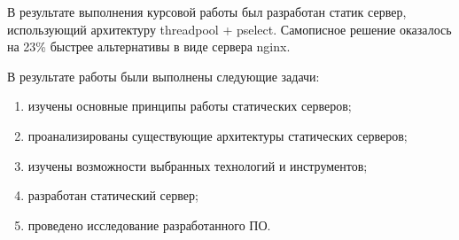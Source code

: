 
В результате выполнения курсовой работы был разработан статик сервер, использующий архитектуру threadpool + pselect. Самописное решение оказалось на 23\% быстрее альтернативы в виде сервера nginx.

В результате работы были выполнены следующие задачи:
\begin{enumerate}
	\item изучены основные принципы работы статических серверов;
	\item проанализированы существующие архитектуры статических серверов;
	\item изучены возможности выбранных технологий и инструментов;
	\item разработан статический сервер;
	\item проведено исследование разработанного ПО.
\end{enumerate}

\clearpage